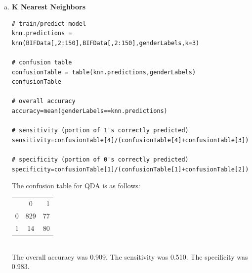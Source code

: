 \documentclass{article}
\begin{document}
\begin{enumerate}[a)]
\item \textbf{K Nearest Neighbors}
\begin{verbatim}
# train/predict model
knn.predictions = knn(BIFData[,2:150],BIFData[,2:150],genderLabels,k=3)

# confusion table
confusionTable = table(knn.predictions,genderLabels)
confusionTable

# overall accuracy
accuracy=mean(genderLabels==knn.predictions)

# sensitivity (portion of 1's correctly predicted)
sensitivity=confusionTable[4]/(confusionTable[4]+confusionTable[3])

# specificity (portion of 0's correctly predicted)
specificity=confusionTable[1]/(confusionTable[1]+confusionTable[2])
\end{verbatim}
The confusion table for QDA is as follows:\\
\begin{tabular}{l c r}
  & 0 & 1 \\
0 & 829 & 77 \\
1 & 14 & 80 \\
\end{tabular}\\
The overall accuracy was 0.909. The sensitivity was 0.510. The specificity was 0.983.\\



\end{enumerate}
\end{document}
